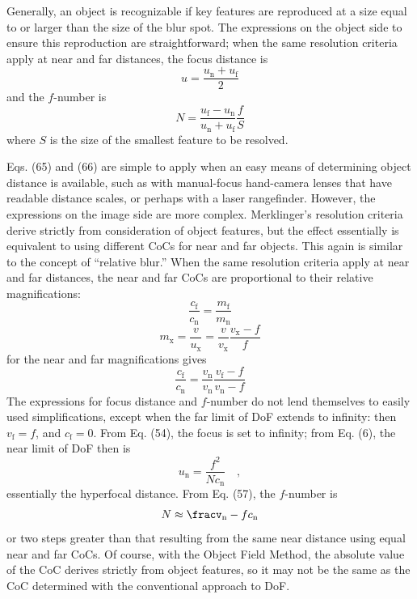 \documentclass[11pt, oneside]{scrartcl}   	%
\begin{document}
Generally, an object is recognizable if key features are reproduced at a size equal to or larger than the size of the blur spot. The expressions on the object side to ensure this reproduction are straightforward; when the same resolution criteria apply at near and far distances, the focus distance is
\begin{equation}
   u=\frac{u_\mathrm{n}+u_\mathrm{f}}2
   \label{eq:65}
\end{equation}
and the $f$-number is
\begin{equation}
   N = \frac{u_\mathrm{f} - u_\mathrm{n}}{u_\mathrm{n}+u_\mathrm{f}}\frac f S
   \label{eq:66}
\end{equation}
where $S$ is the size of the smallest feature to be resolved.

Eqs. (65) and (66) are simple to apply when an easy means of determining object
distance is available, such as with manual-focus hand-camera lenses that have readable distance scales, or perhaps with a laser rangefinder. However, the expressions on the image side are more complex. Merklinger’s resolution criteria derive strictly from consideration of object features, but the effect essentially is equivalent to using different CoCs for near and far objects. This again is similar to the concept of “relative blur.” When the same resolution criteria apply at near and far distances, the near and far CoCs are proportional to their relative magnifications:
\begin{equation}
   \frac{c_\mathrm{f}}{c_\mathrm{n}}=\frac{m_\mathrm{f}}{m_\mathrm{n}}
   \label{eq:67}
\end{equation}
\begin{equation}
   m_\mathrm{x} = \frac v {u_\mathrm{x}} = \frac v {v_\mathrm{x}} \frac{v_\mathrm{x} - f}f
   \label{eq:67+}
\end{equation}
for the near and far magnifications gives
\begin{equation}
   \frac{c_\mathrm{f}}{c_\mathrm{n}} = \frac{v_\mathrm{n}}{v_\mathrm{n}} \frac{v_\mathrm{f} - f}{v_\mathrm{n} - f}
   \label{eq:68}
\end{equation}
The expressions for focus distance and $f$-number do not lend themselves to easily used simplifications, except when the far limit of DoF extends to infinity: then $v_\mathrm{f} = f$, and $c_\mathrm{f} = 0$. From Eq. (54), the focus is set to infinity; from Eq. (6), the near limit of DoF then is
\begin{equation}
   u_\mathrm{n} = \frac{f^2}{N\!c_\mathrm{n}}\quad,
   \label{eq:69}
\end{equation}
essentially the hyperfocal distance. From Eq. (57), the $f$-number is
\begin{equation}
   N \approx {\fracv_\mathrm{n} - f}{c_\mathrm{n}}
   \label{eq:70}
\end{equation}
or two steps greater than that resulting from the same near distance using equal near and far CoCs. Of course, with the Object Field Method, the absolute value of the CoC derives strictly from object features, so it may not be the same as the CoC determined with the conventional approach to DoF.
\end{document}

